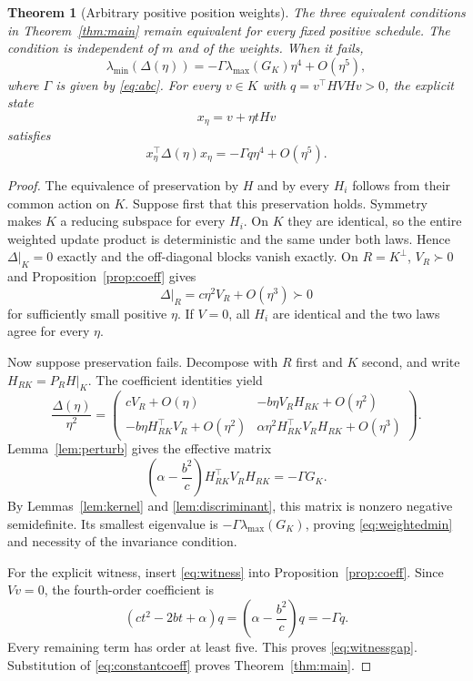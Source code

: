 \documentclass[11pt,letterpaper]{article}
\numberwithin{equation}{section}
\newtheorem{theorem}{Theorem}[section]
\theoremstyle{definition}
\begin{document}
\begin{theorem}[Arbitrary positive position weights]\label{thm:weighted}
The three equivalent conditions in Theorem~\ref{thm:main} remain equivalent for every fixed positive schedule. The condition is independent of $m$ and of the weights. When it fails,
\begin{equation}\label{eq:weightedmin}
 \lambda_{\min}(\Delta(\eta))=-\Gamma\lambda_{\max}(G_K)\eta^4+O(\eta^5),
\end{equation}
where $\Gamma$ is given by \eqref{eq:abc}. For every $v\in K$ with $q=v^\top HVHv>0$, the explicit state
\begin{equation}\label{eq:witness}
 x_\eta=v+\eta tHv
\end{equation}
satisfies
\begin{equation}\label{eq:witnessgap}
 x_\eta^\top\Delta(\eta)x_\eta=-\Gamma q\eta^4+O(\eta^5).
\end{equation}
\end{theorem}

\begin{proof}
The equivalence of preservation by $H$ and by every $H_i$ follows from their common action on $K$. Suppose first that this preservation holds. Symmetry makes $K$ a reducing subspace for every $H_i$. On $K$ they are identical, so the entire weighted update product is deterministic and the same under both laws. Hence $\Delta|_K=0$ exactly and the off-diagonal blocks vanish exactly. On $R=K^\perp$, $V_R\succ0$ and Proposition~\ref{prop:coeff} gives
\[
 \Delta|_R=c\eta^2V_R+O(\eta^3)\succ0
\]
for sufficiently small positive $\eta$. If $V=0$, all $H_i$ are identical and the two laws agree for every $\eta$.

Now suppose preservation fails. Decompose with $R$ first and $K$ second, and write $H_{RK}=P_RH|_K$. The coefficient identities yield
\[
 \frac{\Delta(\eta)}{\eta^2}=
 \begin{pmatrix}
 cV_R+O(\eta)&-b\eta V_RH_{RK}+O(\eta^2)\\
 -b\eta H_{RK}^\top V_R+O(\eta^2)&
 \alpha\eta^2H_{RK}^\top V_RH_{RK}+O(\eta^3)
 \end{pmatrix}.
\]
Lemma~\ref{lem:perturb} gives the effective matrix
\[
 \left(\alpha-\frac{b^2}{c}\right)H_{RK}^\top V_RH_{RK}
 =-\Gamma G_K.
\]
By Lemmas~\ref{lem:kernel} and \ref{lem:discriminant}, this matrix is nonzero negative semidefinite. Its smallest eigenvalue is $-\Gamma\lambda_{\max}(G_K)$, proving \eqref{eq:weightedmin} and necessity of the invariance condition.

For the explicit witness, insert \eqref{eq:witness} into Proposition~\ref{prop:coeff}. Since $Vv=0$, the fourth-order coefficient is
\[
 (ct^2-2bt+\alpha)q
 =\left(\alpha-\frac{b^2}{c}\right)q=-\Gamma q.
\]
Every remaining term has order at least five. This proves \eqref{eq:witnessgap}. Substitution of \eqref{eq:constantcoeff} proves Theorem~\ref{thm:main}.
\end{proof}
\end{document}
